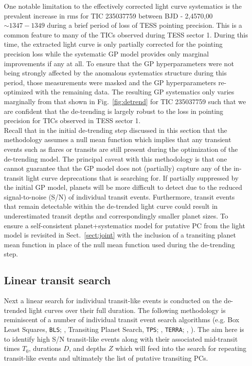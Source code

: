 One notable limitation to the effectively corrected light curve systematics is the prevalent increase
in rms for TIC 235037759 between BJD - 2,4570,00 $\sim 1347-1349$ during a brief period of loss of
TESS pointing precision.  This is a common feature to
many of the TICs observed during TESS sector 1. During this time, the extracted light curve is only
partially corrected for the pointing precision loss while the systematic GP model provides only marginal
improvements if any at all.
To ensure that the GP hyperparameters were not being strongly affected by the anomalous systematics structure
during this period, those measurements were masked and the GP hyperparameters re-optimized with the
remaining data. The resulting GP systematics only varies marginally from that shown in
Fig.~\ref{fig:detrend} for TIC 235037759 such that we are confident that the \pipeline{} de-trending is
largely robust to the loss in pointing precision for TICs observed in TESS sector 1. \\

Recall that in the initial de-trending step discussed in this section that the methodology
assumes a null mean function which implies that any transient events such as flares or transits are still
present during the optimization of the de-trending model.
The principal caveat with this methodology is that one cannot guarantee
that the GP model does not (partially) capture any of the in-transit light curve deprecations that
\pipeline{} is searching for. If partially suppressed by the initial GP model, planets will be more
difficult to detect due to the reduced signal-to-noise (S/N) of individual transit events.
Furthermore, transit events
that remain detectable within the de-trended light curve could result in underestimated transit depths
and correspondingly smaller planet sizes. To ensure a self-consistent planet+systematics model
for putative PC from \pipeline{,} the light model is revisited in Sect.~\ref{sect:joint}
with the inclusion of a transiting planet mean function in place of the null mean function used during
the de-trending step.

\subsection{Linear transit search} \label{sect:linearsearch}
Next a linear search for individual transit-like events is conducted on the de-trended light curves over
their full duration. The following methodology is reminiscent of a number of individual transit event
search algorithms
(e.g. Box Least Squares, \texttt{BLS}; \citealt{kovacs02}, Transiting Planet Search, \texttt{TPS};
\citealt{jenkins10,christiansen13,christiansen15,christiansen16}, \texttt{TERRA};
\citealt{petigura13a}, \citealt{foremanmackey15a}). The aim here is
to identify high S/N transit-like events along with their associated mid-transit times $T_0$,
durations $D$, and depths $Z$ which will feed into the search for repeating transit-like
events and ultimately the list of putative transiting PCs. \\


